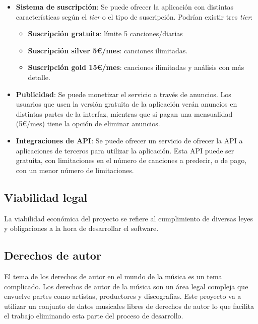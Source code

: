 \begin{itemize}
\tightlist

\item \textbf{Sistema de suscripción}: Se puede ofrecer la aplicación con distintas características según el \textit{tier} o el tipo de suscripción. Podrían existir tres \textit{tier}:
	\begin{itemize}
	\tightlist
	\item \textbf{Suscripción gratuita}: límite 5 canciones/diarias

	\item \textbf{Suscripción silver 5€/mes}: canciones ilimitadas.

	\item \textbf{Suscripción gold 15€/mes}: canciones ilimitadas y análisis con más detalle.
	\end{itemize}

\item \textbf{Publicidad}: Se puede monetizar el servicio a través de anuncios. Los usuarios que usen la versión gratuita de la aplicación verán anuncios en distintas partes de la interfaz, mientras que si pagan una mensualidad (5€/mes) tiene la opción de eliminar anuncios.

\item \textbf{Integraciones de API}: Se puede ofrecer un servicio de ofrecer la API a aplicaciones de terceros para utilizar la aplicación. Esta API puede ser gratuita, con limitaciones en el número de canciones a predecir, o de pago, con un menor número de limitaciones.
\end{itemize}

\subsection{Viabilidad legal}

La viabilidad económica del proyecto se refiere al cumplimiento de diversas leyes y obligaciones a la hora de desarrollar el software.

\subsection{Derechos de autor}

El tema de los derechos de autor en el mundo de la música es un tema complicado. Los derechos de autor de la música son un área legal compleja que envuelve partes como artistas, productores y discografías. Este proyecto va a utilizar un conjunto de datos musicales libres de derechos de autor lo que facilita el trabajo eliminando esta parte del proceso de desarrollo.

